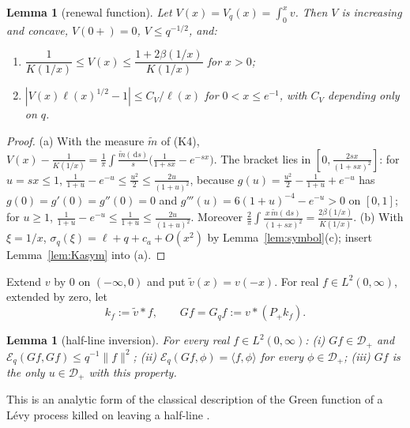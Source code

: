 \documentclass[11pt]{amsart}
\newcommand{\cE}{\mathcal{E}}
\newcommand{\dd}{\,\mathrm{d}}
\newtheorem{lemma}[theorem]{Lemma}
\theoremstyle{definition}
\theoremstyle{remark}
\numberwithin{equation}{section}
\begin{document}
\begin{lemma}[renewal function]\label{lem:V}
Let $V(x)=V_q(x)=\int_0^xv$. Then $V$ is increasing and concave, $V(0+)=0$, $V\le q^{-1/2}$, and:
\begin{enumerate}
\item[(a)] $\dfrac1{K(1/x)}\le V(x)\le\dfrac{1+2\beta(1/x)}{K(1/x)}$ for $x>0$;
\item[(b)] $|V(x)\ell(x)^{1/2}-1|\le C_V/\ell(x)$ for $0<x\le e^{-1}$, with $C_V$ depending only on $q$.
\end{enumerate}
\end{lemma}

\begin{proof}
(a) With the measure $\tilde m$ of (K4), $V(x)-\frac1{K(1/x)}=\frac1\pi\int\frac{\tilde m(\dd s)}s\bigl(\frac1{1+sx}-e^{-sx}\bigr)$. The bracket lies in $[0,\frac{2sx}{(1+sx)^2}]$: for $u=sx\le1$, $\frac1{1+u}-e^{-u}\le\frac{u^2}2\le\frac{2u}{(1+u)^2}$, because $g(u)=\frac{u^2}2-\frac1{1+u}+e^{-u}$ has $g(0)=g'(0)=g''(0)=0$ and $g'''(u)=6(1+u)^{-4}-e^{-u}>0$ on $[0,1]$; for $u\ge1$, $\frac1{1+u}-e^{-u}\le\frac1{1+u}\le\frac{2u}{(1+u)^2}$. Moreover $\frac2\pi\int\frac{x\,\tilde m(\dd s)}{(1+sx)^2}=\frac{2\beta(1/x)}{K(1/x)}$. (b) With $\xi=1/x$, $\sigma_q(\xi)=\ell+q+c_a+O(x^2)$ by Lemma~\ref{lem:symbol}(c); insert Lemma~\ref{lem:Kasym} into (a).
\end{proof}

Extend $v$ by $0$ on $(-\infty,0)$ and put $\tilde v(x)=v(-x)$. For real $f\in L^2(0,\infty)$, extended by zero, let
\[
k_f:=\tilde v*f,\qquad Gf=G_qf:=v*(P_+k_f).
\]

\begin{lemma}[half-line inversion]\label{lem:WH}
For every real $f\in L^2(0,\infty)$: (i) $Gf\in \mathcal D_+$ and $\cE_q(Gf,Gf)\le q^{-1}\|f\|^2$; (ii) $\cE_q(Gf,\phi)=\langle f,\phi\rangle$ for every $\phi\in \mathcal D_+$; (iii) $Gf$ is the only $u\in \mathcal D_+$ with this property.
\end{lemma}

This is an analytic form of the classical description of the Green function of a L\'evy process killed on leaving a half-line \cite[Thm.~VI.20]{Bertoin96}.
\end{document}
